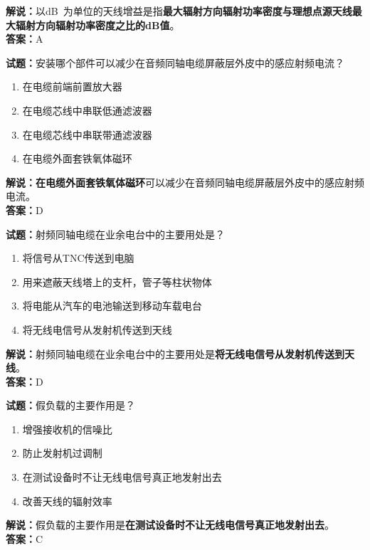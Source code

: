 \documentclass{ctexbook}
\begin{document}
\noindent\textbf{解说：}以\unit[qualifier-mode=combine]{\deci\bel{}}为单位的天线增益是指\textbf{最大辐射方向辐射功率密度与理想点源天线最大辐射方向辐射功率密度之比的\si{\dB}值}。\\\noindent\textbf{答案：}A

\bigskip

\noindent\textbf{试题：}安装哪个部件可以减少在音频同轴电缆屏蔽层外皮中的感应射频电流？

\begin{enumerate}[leftmargin=3em]
  \item 在电缆前端前置放大器
  \item 在电缆芯线中串联低通滤波器
  \item 在电缆芯线中串联带通滤波器
  \item 在电缆外面套铁氧体磁环
\end{enumerate}

\noindent\textbf{解说：}\textbf{在电缆外面套铁氧体磁环}可以减少在音频同轴电缆屏蔽层外皮中的感应射频电流。\\\noindent\textbf{答案：}D

\bigskip

\noindent\textbf{试题：}射频同轴电缆在业余电台中的主要用处是？

\begin{enumerate}[leftmargin=3em]
  \item 将信号从TNC传送到电脑
  \item 用来遮蔽天线塔上的支杆，管子等柱状物体
  \item 将电能从汽车的电池输送到移动车载电台
  \item 将无线电信号从发射机传送到天线
\end{enumerate}

\noindent\textbf{解说：}射频同轴电缆在业余电台中的主要用处是\textbf{将无线电信号从发射机传送到天线}。\\\noindent\textbf{答案：}D

\bigskip

\noindent\textbf{试题：}假负载的主要作用是？

\begin{enumerate}[leftmargin=3em]
  \item 增强接收机的信噪比
  \item 防止发射机过调制
  \item 在测试设备时不让无线电信号真正地发射出去
  \item 改善天线的辐射效率
\end{enumerate}

\noindent\textbf{解说：}假负载的主要作用是\textbf{在测试设备时不让无线电信号真正地发射出去}。\\\noindent\textbf{答案：}C
\end{document}
